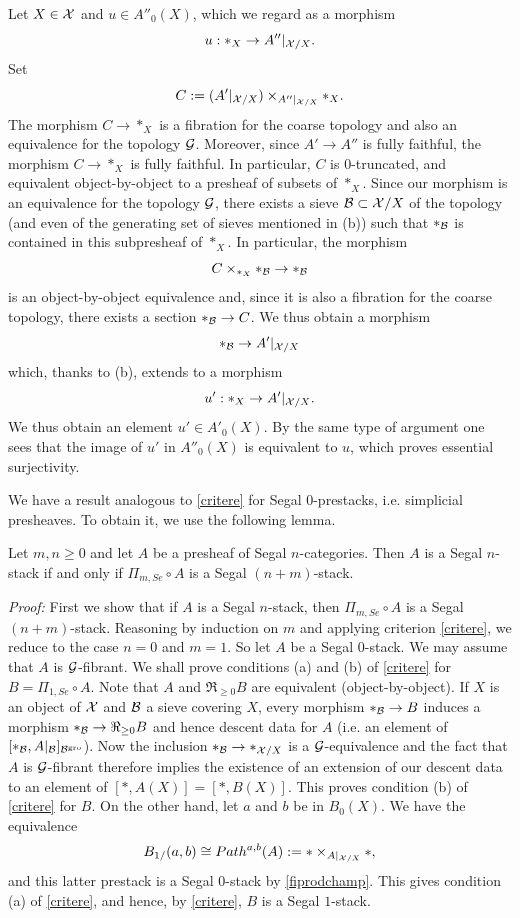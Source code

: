 Let $X\in {\cal X}$ and $u\in A''_0(X)$, which we regard as a morphism
$$
u: \ast _X \rightarrow A'' |_{{\cal X} /X}.
$$
Set
$$
C:= (A'|_{{\cal X} /X})\times _{A'' |_{{\cal X} /X}}\ast _X .
$$
The morphism $C\rightarrow \ast _X$ is a fibration for the coarse topology and
also an equivalence for the topology ${\cal G}$. Moreover, since
$A'\rightarrow A''$ is fully faithful, the morphism $C\rightarrow \ast _X$ is
fully faithful. In particular, $C$ is $0$-truncated, and equivalent
object-by-object to a presheaf of subsets of $\ast _X$. Since our morphism is
an equivalence for the topology ${\cal G}$, there exists a sieve
${\cal B} \subset {\cal X} /X$ of the topology (and even of the generating set of sieves
mentioned in (b)) such that $\ast _{{\cal B}}$ is contained in this subpresheaf of
$\ast _X$. In particular, the morphism
$$
C\times _{\ast _X}\ast _{{\cal B}} \rightarrow \ast _{{\cal B}}
$$
is an object-by-object equivalence and, since it is also a fibration for the
coarse topology, there exists a section $\ast _{{\cal B} }\rightarrow C$. We thus
obtain a morphism
$$
\ast _{{\cal B}} \rightarrow A'|_{{\cal X} /X}
$$
which, thanks to (b), extends to a morphism
$$
u':\ast _{X} \rightarrow A'|_{{\cal X} /X}.
$$
We thus obtain an element $u'\in A'_0(X)$. By the same type of argument one
sees that the image of $u'$ in $A''_0(X)$ is equivalent to $u$, which proves
essential surjectivity.
\eop


We have a result analogous to \ref{critere} for Segal $0$-prestacks, i.e.
simplicial presheaves. To obtain it, we use the following lemma.

\begin{lemma}
\label{pimseg}
Let $m,n\geq 0$ and let $A$ be a presheaf of Segal $n$-categories.
Then $A$ is a Segal $n$-stack if and only if $\Pi _{m,Se}\circ A$ is a Segal
$(n+m)$-stack.
\end{lemma}
{\em Proof:}
First we show that if $A$ is a Segal $n$-stack, then $\Pi _{m,Se}\circ A$ is a
Segal $(n+m)$-stack. Reasoning by induction on $m$ and applying criterion
\ref{critere}, we reduce to the case $n=0$ and $m=1$. So let $A$ be a Segal
$0$-stack. We may assume that $A$ is ${\cal G}$-fibrant. We shall prove conditions
(a) and (b) of \ref{critere} for $B=\Pi _{1,Se}\circ A$. Note that $A$ and
$\Re _{\geq 0}B$ are equivalent (object-by-object). If $X$ is an object of
${\cal X}$ and ${\cal B}$ a sieve covering $X$, every morphism $\ast _{{\cal B}}\rightarrow B$
induces a morphism $\ast _{{\cal B}}\rightarrow \Re _{\geq 0}B$ and hence descent
data for $A$ (i.e. an element of $[\ast _{{\cal B}}, A|_{{\cal B} }]_{{\cal B} ^{\rm gro}}$).
Now the inclusion $\ast _{{\cal B}}\rightarrow \ast _{{\cal X} /X}$ is a
${\cal G}$-equivalence and the fact that $A$ is ${\cal G}$-fibrant therefore implies the
existence of an extension of our descent data to an element of
$[\ast , A(X)]= [\ast , B(X)]$. This proves condition (b) of \ref{critere} for
$B$. On the other hand, let $a$ and $b$ be in $B_0(X)$. We have the equivalence
$$
B_{1/}(a,b) \cong Path ^{a,b}(A):= \ast \times _{A|_{{\cal X} /X}}\ast ,
$$
and this latter prestack is a Segal $0$-stack by \ref{fiprodchamp}. This gives
condition (a) of \ref{critere}, and hence, by \ref{critere}, $B$ is a Segal
$1$-stack.

